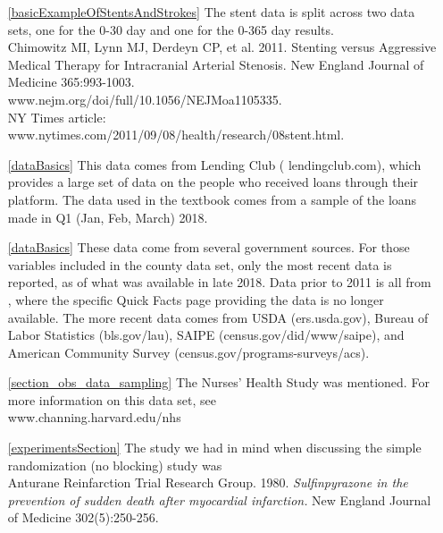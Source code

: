 \begin{itemize}
\item[\ref{basicExampleOfStentsAndStrokes}]
    The stent data is split across two data sets,
    one for the 0-30 day and one for the 0-365 day results. \\
    Chimowitz MI, Lynn MJ, Derdeyn CP, et al. 2011.
    Stenting versus Aggressive Medical Therapy for
    Intracranial Arterial Stenosis.
    New England Journal of Medicine 365:993-1003.\\
        {www.nejm.org/doi/full/10.1056/NEJMoa1105335}. \\
    NY Times article:
        {www.nytimes.com/2011/09/08/health/research/08stent.html}.

\item[\ref{dataBasics}]
    This data comes from Lending Club
    (
        {lendingclub.com}),
    which provides a large set of data on the people who
    received loans through their platform.
    The data used in the textbook comes from a sample
    of the loans made in Q1 (Jan, Feb, March) 2018.
\item[\ref{dataBasics}]
    These data come from several government sources.
    For those variables included in the
    county data set, only the most recent data is reported,
    as of what was available in late 2018.
    Data prior to 2011 is all from
    ,
    where the specific Quick Facts page providing the data
    is no longer available.
    The more recent data comes from
        {USDA (ers.usda.gov)},
        {Bureau of Labor Statistics (bls.gov/lau)},
        {SAIPE (census.gov/did/www/saipe)},
    and
        {American Community Survey
            (census.gov/programs-surveys/acs)}.

\item[\ref{section_obs_data_sampling}]
    The Nurses' Health Study was mentioned.
    For more information on this data set, see \\
        {www.channing.harvard.edu/nhs}

\item[\ref{experimentsSection}]
    The study we had in mind when discussing the
    simple randomization (no blocking) study was \\
    Anturane Reinfarction Trial Research Group. 1980.
    \emph{Sulfinpyrazone in the prevention of sudden
    death after myocardial infarction.}
    New England Journal of Medicine 302(5):250-256.
\end{itemize}







